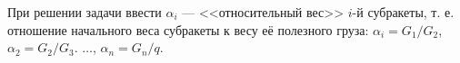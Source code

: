При решении задачи ввести $\alpha _i$ --- <<относительный вес>> $i$-й субракеты,
т. е. отношение начального веса субракеты к весу её полезного груза:
$\alpha _i = G_1/G_2$, $\alpha _2 = G_2/G_3$. $\dots$, $\alpha _n = G_n/q$.

